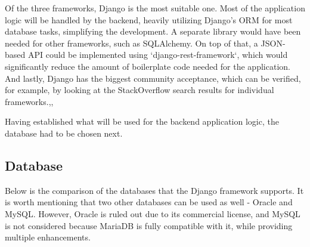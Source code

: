 Of the three frameworks, Django is the most suitable one.
Most of the application logic will be handled by the backend, heavily utilizing
Django's ORM for most database tasks, simplifying the development. A separate library would
have been needed for other frameworks, such as SQLAlchemy\cite{sqlalchemy}.
On top of that, a JSON-based API could be implemented using `django-rest-framework`,
which would significantly reduce the amount of boilerplate code needed for the application.
And lastly, Django has the biggest community acceptance, which can be verified, for example, by looking at the
StackOverflow\cite{stackoverflow} search results for individual frameworks.\cite{so_fastapi},\cite{so_django},\cite{so_flask}

Having established what will be used for the backend application logic, the database had to be chosen next.

\subsection{Database}
Below is the comparison of the databases that the Django framework supports.
It is worth mentioning that two other databases can be used as well - Oracle and MySQL.
However, Oracle is ruled out due to its commercial license, and MySQL is not considered because
MariaDB is fully compatible with it, while providing multiple enhancements.

